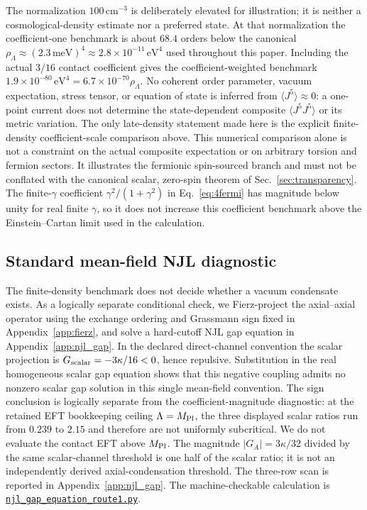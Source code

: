 \documentclass[aps,prd,twocolumn,superscriptaddress,preprintnumbers,nofootinbib,longbibliography,floatfix]{revtex4-2}
\newcommand{\artifactnamed}[2]{\href{https://github.com/Hubify-Projects/bigbounce/blob/7befce143848b925998a3e6ecc850aa510ab3a94/#1}{\nolinkurl{#2}}}
\begin{document}
The normalization $100\,\mathrm{cm}^{-3}$ is deliberately elevated for
illustration; it is neither a cosmological-density estimate nor a preferred
state.  At that normalization the coefficient-one benchmark is about $68.4$
orders below the canonical
$\rho_\Lambda\approx (2.3\,\text{meV})^4 \approx 2.8\times 10^{-11}\,\text{eV}^4$
used throughout this paper.  Including the actual $3/16$ contact coefficient
gives the coefficient-weighted benchmark
$1.9\times10^{-80}\,\text{eV}^4=6.7\times10^{-70}\rho_\Lambda$.
No coherent order parameter, vacuum expectation, stress tensor, or equation of
state is inferred from $\langle J^5\rangle\approx0$: a one-point current does
not determine the state-dependent composite $\langle J^5J^5\rangle$ or its
metric variation.  The only late-density statement made here is the explicit
finite-density coefficient-scale comparison above.
This numerical comparison alone is not a constraint on the actual composite
expectation or on arbitrary torsion and fermion sectors.  It illustrates the
fermionic spin-sourced branch and must not be conflated with the canonical
scalar, zero-spin theorem of Sec.~\ref{sec:transparency}.  The finite-$\gamma$ coefficient
$\gamma^2/(1+\gamma^2)$ in Eq.~\eqref{eq:4fermi} has magnitude below unity for
real finite $\gamma$, so it does not increase this coefficient benchmark above
the Einstein--Cartan limit used in the calculation.

\subsection{Standard mean-field NJL diagnostic}

The finite-density benchmark does not decide whether a vacuum condensate
exists.  As a logically separate conditional check, we Fierz-project the
axial--axial operator using the exchange ordering and Grassmann sign fixed in
Appendix~\ref{app:fierz}, and solve a
hard-cutoff NJL gap equation in Appendix~\ref{app:njl_gap}.  In the declared
direct-channel convention the scalar projection is
$G_{\rm scalar}=-3\kappa/16<0$, hence repulsive.  Substitution in the real
homogeneous scalar gap equation shows that this negative coupling admits no
nonzero scalar gap solution in this single mean-field convention.  The sign
conclusion is logically separate from the
coefficient-magnitude diagnostic: at the retained EFT bookkeeping ceiling
$\Lambda=M_{\rm Pl}$, the three displayed scalar ratios run from $0.239$ to
$2.15$ and therefore are not uniformly subcritical.  We do not evaluate the
contact EFT above $M_{\rm Pl}$.  The magnitude $|G_A|=3\kappa/32$ divided by
the same scalar-channel threshold is one half of the scalar ratio; it is not
an independently derived axial-condensation threshold.  The three-row scan is
reported in Appendix~\ref{app:njl_gap}.
The machine-checkable calculation is
\artifactnamed{arxiv/scripts/njl_gap_equation_route1.py}{njl_gap_equation_route1.py}.
\end{document}
